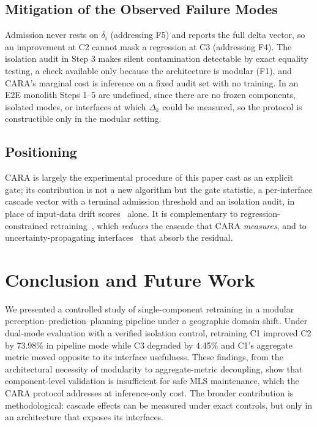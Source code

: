 \documentclass[conference]{IEEEtran}
\begin{document}
\subsection{Mitigation of the Observed Failure Modes}
Admission never rests on $\delta_i$ (addressing F5) and reports the full delta
vector, so an improvement at C2 cannot mask a regression at C3 (addressing F4).
The isolation audit in Step 3 makes silent contamination detectable by exact
equality testing, a check available only because the architecture is modular
(F1), and CARA's marginal cost is inference on a fixed audit set with no
training. In an E2E monolith Steps 1--5 are undefined, since there are no frozen
components, isolated modes, or interfaces at which $\Delta_k$ could be measured,
so the protocol is constructible only in the modular setting.

\subsection{Positioning}
CARA is largely the experimental procedure of this paper cast as an explicit
gate; its contribution is not a new algorithm but the gate statistic, a
per-interface cascade vector with a terminal admission threshold and an
isolation audit, in place of input-data drift scores~\cite{breck2019data}
alone. It is complementary to regression-constrained
retraining~\cite{yan2021pctraining,shen2020bct}, which \emph{reduces} the
cascade that CARA \emph{measures}, and to uncertainty-propagating
interfaces~\cite{ivanovic2022propagating} that absorb the residual.

\section{Conclusion and Future Work}
\label{sec:conclusion}
We presented a controlled study of single-component retraining in a modular
perception--prediction--planning pipeline under a geographic domain shift.
Under dual-mode evaluation with a verified isolation control, retraining C1
improved C2 by 73.98\% in pipeline mode while C3 degraded by 4.45\% and C1's
aggregate metric moved opposite to its interface usefulness. These findings,
from the architectural necessity of modularity to aggregate-metric decoupling,
show that component-level validation is insufficient for safe MLS maintenance,
which the CARA protocol addresses at inference-only cost. The broader
contribution is methodological: cascade effects can be measured under exact
controls, but only in an architecture that exposes its interfaces.
\end{document}
